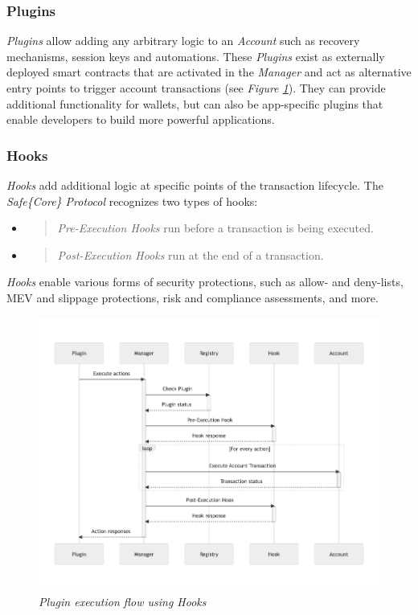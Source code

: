 \documentclass[
]{article}
\begin{document}
\hypertarget{plugins}{%
  \subsubsection{Plugins}\label{plugins}}

\emph{Plugins} allow adding any arbitrary logic to an \emph{Account} such as recovery mechanisms, session keys and automations. These \emph{Plugins} exist as externally deployed smart contracts that are activated in the \emph{Manager} and act as alternative entry points to trigger account transactions (see \emph{Figure \ref{fig:interact_plugin}}). They can provide additional functionality for wallets, but can also be app-specific plugins that enable developers to build more powerful applications.

\hypertarget{hooks}{%
  \subsubsection{Hooks}\label{hooks}}

\emph{Hooks} add additional logic at specific points of the transaction lifecycle. The \emph{Safe\{Core\} Protocol} recognizes two types of hooks:

\begin{itemize}
  \item
        \begin{quote}
          \emph{Pre-Execution Hooks} run before a transaction is being executed.
        \end{quote}
  \item
        \begin{quote}
          \emph{Post-Execution Hooks} run at the end of a transaction.
        \end{quote}
\end{itemize}

\emph{Hooks} enable various forms of security protections, such as allow- and deny-lists, MEV and slippage protections, risk and compliance assessments, and more.

\begin{figure}[h]
  \centering
  \includegraphics{graph_interact_plugin.png}
  \caption{\emph{Plugin execution flow using Hooks}}
  \label{fig:interact_plugin}
\end{figure}
\end{document}
